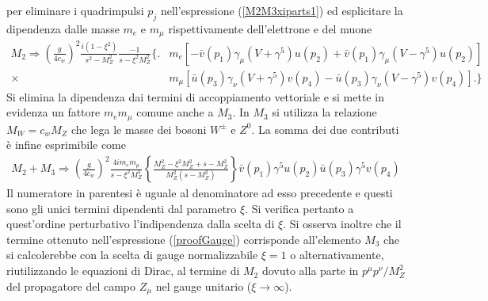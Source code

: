\documentclass[11pt]{article}
\begin{document}
    per eliminare i quadrimpulsi $p_j$ nell'espressione (\ref{M2M3xiparts1}) ed esplicitare la dipendenza dalle masse $m_e$ e $m_\mu$ rispettivamente dell'elettrone e del muone
    \begin{equation}
    \begin{split}
    M_2\Rightarrow\left(\frac{g}{4c_w}\right)^2 \frac{i(1-\xi^2)}{s^2-M_Z^2}\frac{-1}{s-\xi^2 M_Z^2}\Big\{ \Big.&m_e[-\bar{v}(p_1)\gamma_\mu(V+\gamma^5)u(p_2)+\bar{v}(p_1)\gamma_\mu(V-\gamma^5)u(p_2)] \\
    \times &m_\mu[\bar{u}(p_3)\gamma_\nu(V+\gamma^5)v(p_4)-\bar{u}(p_3)\gamma_\nu(V-\gamma^5)v(p_4)]\Big. \Big\}
    \end{split}
    \end{equation}
    Si elimina la dipendenza dai termini di accoppiamento vettoriale e si mette in evidenza un fattore $m_em_\mu$ comune anche a $M_3$. In $M_3$ si utilizza la relazione $M_W=c_wM_Z$ che lega le masse dei bosoni $W^\pm$ e $Z^0$. La somma dei due contributi è infine
    esprimibile come
    \begin{equation}\label{proofGauge}
    \begin{split}
    M_2+M_3\Rightarrow\left(\frac{g}{4c_w}\right)^2\frac{4im_e m_\mu}{s-\xi^2M_Z^2}\left\{\frac{M_Z^2-\xi^2M_Z^2+s-M_Z^2}{M_Z^2(s-M_Z^2)}\right\}\bar{v}(p_1)\gamma^5u(p_2)\bar{u}(p_3)\gamma^5v(p_4)
    \end{split}
    \end{equation}
    Il numeratore in parentesi è uguale al denominatore ad esso precedente e questi sono gli unici termini dipendenti dal parametro $\xi$. Si verifica pertanto a quest'ordine perturbativo l'indipendenza dalla scelta di $\xi$. Si osserva inoltre che
    il termine ottenuto nell'espressione (\ref{proofGauge}) corrisponde all'elemento $M_3$ che si calcolerebbe con la scelta di gauge normalizzabile $\xi=1$ o alternativamente, riutilizzando le equazioni di Dirac, al termine di $M_2$ dovuto alla parte in
    $p^\mu p^\nu/M_Z^2$ del propagatore del campo $Z_\mu$ nel gauge unitario ($\xi\to\infty$).
\end{document}
